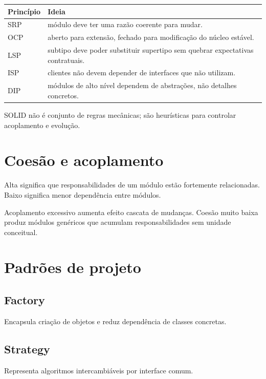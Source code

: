 \begin{table}[ht]
\centering
\small
\begin{tabularx}{\textwidth}{l X}
\toprule
Princípio & Ideia \\
\midrule
SRP & módulo deve ter uma razão coerente para mudar. \\
OCP & aberto para extensão, fechado para modificação do núcleo estável. \\
LSP & subtipo deve poder substituir supertipo sem quebrar expectativas contratuais. \\
ISP & clientes não devem depender de interfaces que não utilizam. \\
DIP & módulos de alto nível dependem de abstrações, não detalhes concretos. \\
\bottomrule
\end{tabularx}
\end{table}

SOLID não é conjunto de regras mecânicas; são heurísticas para controlar acoplamento e evolução.

\section{Coesão e acoplamento}

Alta  significa que responsabilidades de um módulo estão fortemente relacionadas. Baixo  significa menor dependência entre módulos.

Acoplamento excessivo aumenta efeito cascata de mudanças. Coesão muito baixa produz módulos genéricos que acumulam responsabilidades sem unidade conceitual.

\section{Padrões de projeto}

\subsection{Factory}

Encapsula criação de objetos e reduz dependência de classes concretas.

\subsection{Strategy}

Representa algoritmos intercambiáveis por interface comum.

